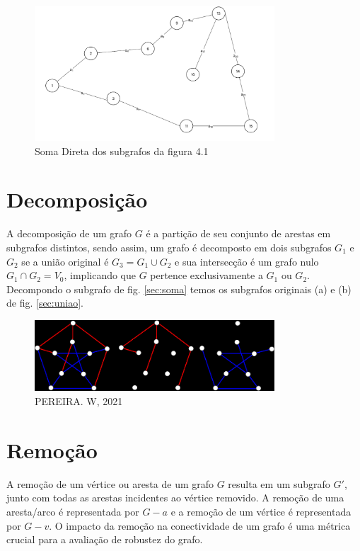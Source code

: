 	\begin{figure}[!h]
		\centering
		\includegraphics[width=0.8\textwidth]{figuras/subgrafos/subgrafo_soma_direta.png}
		\caption{Soma Direta dos subgrafos da figura 4.1}
		\label{fig:somaDiretaGrafos}
	\end{figure}
	
	\section{Decomposição}\label{sec:decomposicao}
	A decomposição de um grafo $G$ é a partição de seu conjunto de arestas em subgrafos distintos, sendo assim, um grafo é decomposto em dois subgrafos $G_1$ e $G_2$ se a união original é $G_3 = G_1 \cup G_2$ e sua intersecção é um grafo nulo $G_1 \cap G_2 = V_0$, implicando que $G$ pertence exclusivamente a $G_1$ ou $G_2$. Decompondo o subgrafo de fig. \ref{sec:soma} temos os subgrafos originais (a) e (b) de fig. \ref{sec:uniao}.
	
	\begin{figure}[!h]
		\centering
		\includegraphics[width=0.8\textwidth]{figuras/images.png}
		\caption{PEREIRA. W, 2021}
		\label{fig:decomposicao}
	\end{figure}
	
	\section{Remoção}\label{sec:remocao}
	A remoção de um vértice ou aresta de um grafo $G$ resulta em um subgrafo $G'$, junto com todas as arestas incidentes ao vértice removido. A remoção de uma aresta/arco é representada por $G - a$ e a remoção de um vértice é representada por $G - v$. O impacto da remoção na conectividade de um grafo é uma métrica crucial para a avaliação de robustez do grafo.
	
